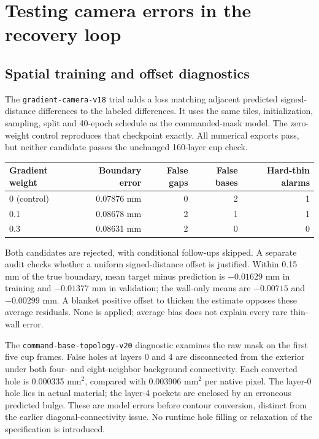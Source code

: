 \documentclass[10pt,letterpaper]{article}
\begin{document}
\clearpage
\section{Testing camera errors in the recovery loop}

\subsection*{Spatial training and offset diagnostics}
The \texttt{gradient-camera-v18} trial adds a loss matching adjacent predicted
signed-distance differences to the labeled differences. It uses the same tiles,
initialization, sampling, split and 40-epoch schedule as the commanded-mask
model. The zero-weight control reproduces that checkpoint exactly. All numerical
exports pass, but neither candidate passes the unchanged 160-layer cup check.

\begin{center}
\begin{tabular}{@{}lrrrr@{}}
\toprule
Gradient weight & Boundary error & False gaps & False bases & Hard-thin alarms \\
\midrule
0 (control) & 0.07876 mm & 0 & 2 & 1 \\
0.1 & 0.08678 mm & 2 & 1 & 1 \\
0.3 & 0.08631 mm & 2 & 0 & 0 \\
\bottomrule
\end{tabular}
\end{center}

Both candidates are rejected, with conditional follow-ups skipped. A separate
audit checks whether a uniform signed-distance offset is justified. Within
0.15 mm of the true boundary, mean target minus prediction is $-0.01629$ mm in
training and $-0.01377$ mm in validation; the wall-only means are $-0.00715$ and
$-0.00299$ mm. A blanket positive offset to thicken the estimate opposes these
average residuals. None is applied; average bias does not explain every rare
thin-wall error.

The \texttt{command-base-topology-v20} diagnostic examines the raw mask on the
first five cup frames. False holes at layers 0 and 4 are disconnected from the
exterior under both four- and eight-neighbor background connectivity. Each
converted hole is 0.000335 mm$^2$, compared with 0.003906 mm$^2$ per native pixel.
The layer-0 hole lies in actual material; the layer-4 pockets are enclosed by an
erroneous predicted bulge. These are model errors before contour conversion,
distinct from the earlier diagonal-connectivity issue. No runtime hole filling
or relaxation of the specification is introduced.
\end{document}
